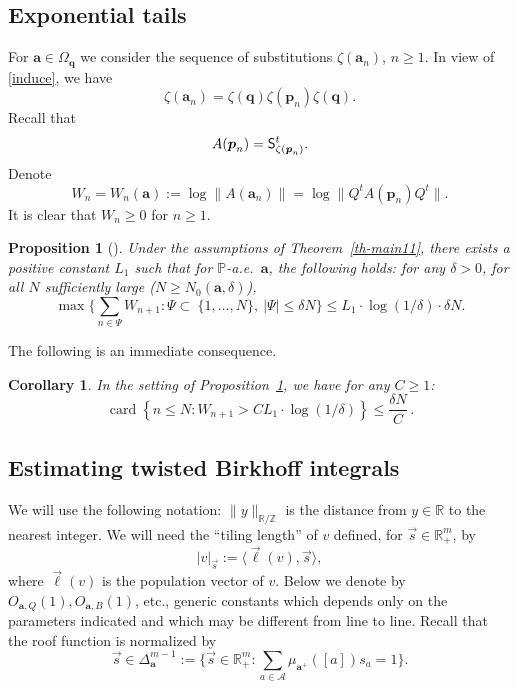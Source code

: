 \documentclass[11pt]{article}
\numberwithin{equation}{section}\newcommand{\Relation}[2][]{}\newtheorem*{prop*}{Proposition}
\let\mathcal\mathscr
\newcommand{\sep}{:}
\theoremstyle{plain}
\newtheorem{corollary}[theorem]{Corollary}
\newtheorem{prop}[theorem]{Proposition}
\theoremstyle{definition}
\DeclareMathOperator{\card}{card}
\newcommand\bom{{\boldsymbol a}}\let\ba\bom
\newcommand\bp{{\boldsymbol p}}
\newcommand\bq{{\boldsymbol q}}
\let\Om\Omega
\newcommand\Ak{\mathcal{A}}
\newcommand{\R}{\mathbb{R}}
\newcommand{\Z}{\mathbb{Z}}
\renewcommand{\P}{\mathbb{P}}
\newcommand\Sf{{\sf S}}
\newcommand\be{\begin{equation}}
\newcommand\ee{\end{equation}}
\begin{document}
\subsection{Exponential tails}

For $\bom\in \Om_\bq$ we consider the sequence of substitutions $\zeta(\bom_n)$, $n\ge 1$. In view of \eqref{induce}, we have
\[
\zeta(\bom_n) = \zeta(\bq) \zeta(\bp_n)\zeta(\bq).
\]
Recall that
\[
A(\bp_n) = \Sf_{\zeta(\bp_n)}^t.
\]
Denote
\be \label{def-W}
W_n = W_n(\bom):=\log\|A(\bom_n)\| = \log\|Q^t A(\bp_n) Q^t\|.
\ee
It is clear that $W_n\ge 0$ for $n\ge 1$.

\begin{prop}[{\cite[Prop.\,6.1]{BuSo18a}}] \label{prop-proba}
Under the assumptions of Theorem~\ref{th-main11},
there exists a positive constant $L_1$ such that for $\P$-a.e.\ $\bom$, the following holds: for any $\delta>0$, for all $N$ sufficiently large ($N\ge N_0(\bom,\delta)$),
\be \label{w-cond2}\textstyle
\max\bigl\{\sum_{n\in \Psi} W_{n+1}\sep \Psi\subset \ \{1,\ldots,N\},\ |\Psi| \le \delta N\bigr\} \le L_1\cdot \log(1/\delta)
\cdot \delta N.
\ee
\end{prop}

The following is an immediate consequence.

\begin{corollary} \label{cor-immed}
In the setting of Proposition~\ref{prop-proba}, we have for any $C\ge 1$:
\be \label{eq-immed}
\card\left\{n\le N\sep W_{n+1} > C L_1\cdot \log(1/\delta)\right\} \le \frac{\delta N}{C}\,.
\ee
\end{corollary}

\subsection{Estimating twisted Birkhoff integrals}

We will use the following notation: $\|y\|_{\R/\Z}$ is the distance from $y\in \R$ to the nearest integer.
We will need the
``tiling length'' of $v$ defined, for $\vec s\in \R^m_+$, by
\be \label{tilength}
|v|_{\vec{s}}:= \langle\vec{\ell}(v), \vec{s}\rangle,
\ee
where $\vec{\ell}(v)$ is the population vector of $v$.
Below we denote by $O_{\bom,Q}(1), O_{\bom,B}(1)$, etc., generic constants which depends only on the parameters indicated and which may be different from line to line. Recall that the roof function is normalized by
\[\textstyle
\vec{s}\in \Delta_{\bom}^{m-1}:= \bigl\{\vec{s}\in \R^m_+\sep \sum_{a\in \Ak} \mu_{\bom^+}([a]) s_a =1\bigr\}.
\]
\end{document}
